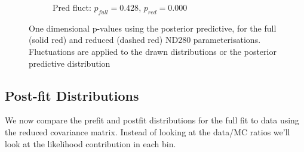 \begin{figure}[h]
\begin{subfigure}[t]{0.49\textwidth}
		\caption{Pred fluct: $p_{full}=0.428$, $p_{red}=0.000$}
	\end{subfigure}
\caption{One dimensional p-values using the posterior predictive, for the full (solid red) and reduced (dashed red) ND280 parameterisations. Fluctuations are applied to the drawn distributions or the posterior predictive distribution}
\label{fig:1d_pval_2018}
\end{figure}

\subsection{Post-fit Distributions}
We now compare the prefit and postfit distributions for the full fit to data using the reduced covariance matrix. Instead of looking at the data/MC ratios we'll look at the likelihood contribution in each bin.

